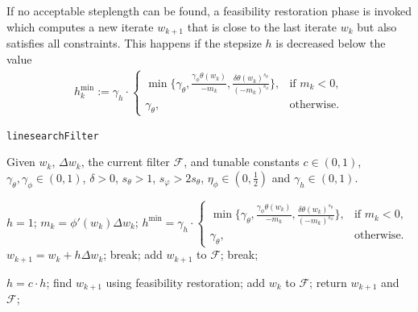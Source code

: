 \documentclass{article}
\numberwithin{equation}{section}
\theoremstyle{nonumberplain}
\begin{document}
If no acceptable steplength can be found, a feasibility restoration phase is invoked which computes a new iterate $w_{k+1}$ that is close to the last iterate $w_k$ but also satisfies all constraints. This happens if the stepsize $h$ is decreased below the value
\begin{align*}
h_k^\mathrm{min} := \gamma_h \cdot \begin{cases}
\min \lbrace \gamma_\theta, \frac{\gamma_\phi \theta(w_k)}{- m_k}, \frac{\delta \theta(w_k)^{s_\theta}}{(-m_k)^{s_\phi}} \rbrace, & \text{if } m_k < 0, \\
\gamma_\theta, & \text{otherwise}.
\end{cases}
\end{align*}

\begin{algorithm}[H]
\caption{\texttt{linesearchFilter}}
Given $w_k$, $\Delta w_k$, the current filter $\mathcal F$, and tunable constants $c \in (0,1)$, $\gamma_\theta, \gamma_\phi \in (0,1)$, $\delta > 0$, $s_\theta > 1$, $s_\varphi > 2 s_\theta$, $\eta_\phi \in (0,\frac{1}{2})$ and $\gamma_h \in (0,1)$.
\begin{algorithmic}[1]\label{alg:cgn}
\State $h = 1$;
\State $m_k = \phi'(w_k)\Delta w_k$;
\State $h^\mathrm{min} = \gamma_h \cdot \begin{cases}
\min \lbrace \gamma_\theta, \frac{\gamma_\phi \theta(w_k)}{- m_k}, \frac{\delta \theta(w_k)^{s_\theta}}{(-m_k)^{s_\phi}} \rbrace, & \text{if } m_k < 0, \\
\gamma_\theta, & \text{otherwise}.
\end{cases}$
\Repeat
\State $w_{k+1} = w_k + h \Delta w_k$;
\State break;
\EndIf
\EndIf
{}
\State add $w_{k+1}$ to $\mathcal F$;
\EndIf
\State break;
\EndIf
\EndIf

\State $h = c \cdot h$;
\State find $w_{k+1}$ using feasibility restoration;
\State add $w_k$ to $\mathcal F$;
\EndIf
\State return $w_{k+1}$ and $\mathcal F$;
\end{algorithmic}
\end{algorithm}



\printbibliography
\end{document}
